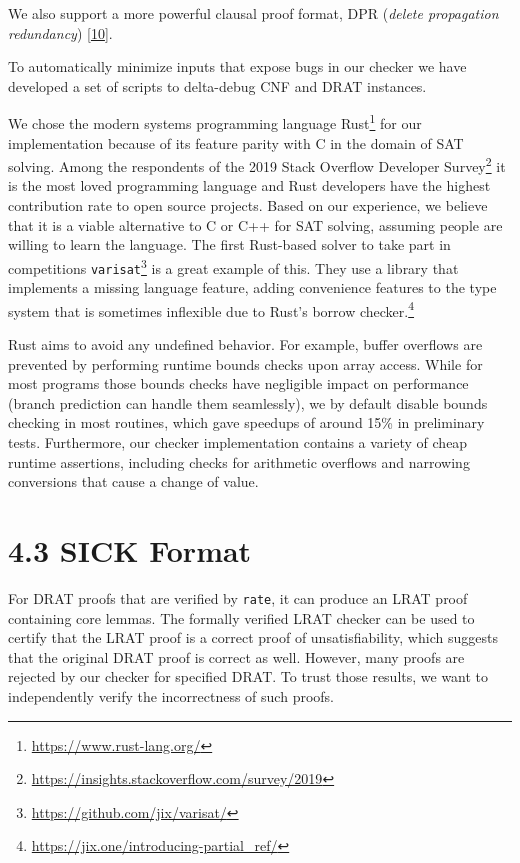 \documentclass[
]{report}
\begin{document}
We also support a more powerful clausal proof format, DPR (\emph{delete
propagation redundancy})
{[}\protect\hyperlink{ref-DBLP:confux2fcadeux2fHeuleKB17}{10}{]}.

To automatically minimize inputs that expose bugs in our checker we have
developed a set of scripts to delta-debug CNF and DRAT instances.

We chose the modern systems programming language Rust\footnote{\url{https://www.rust-lang.org/}}
for our implementation because of its feature parity with C in the
domain of SAT solving. Among the respondents of the 2019 Stack Overflow
Developer Survey\footnote{\url{https://insights.stackoverflow.com/survey/2019}}
it is the most loved programming language and Rust developers have the
highest contribution rate to open source projects. Based on our
experience, we believe that it is a viable alternative to C or C++ for
SAT solving, assuming people are willing to learn the language. The
first Rust-based solver to take part in competitions
\texttt{varisat}\footnote{\url{https://github.com/jix/varisat/}} is a
great example of this. They use a library that implements a missing
language feature, adding convenience features to the type system that is
sometimes inflexible due to Rust's borrow checker.\footnote{\url{https://jix.one/introducing-partial_ref/}}

Rust aims to avoid any undefined behavior. For example, buffer overflows
are prevented by performing runtime bounds checks upon array access.
While for most programs those bounds checks have negligible impact on
performance (branch prediction can handle them seamlessly), we by
default disable bounds checking in most routines, which gave speedups of
around 15\% in preliminary tests. Furthermore, our checker
implementation contains a variety of cheap runtime assertions, including
checks for arithmetic overflows and narrowing conversions that cause a
change of value.

\hypertarget{sick-format}{%
\section{4.3 SICK Format}\label{sick-format}}

For DRAT proofs that are verified by \texttt{rate}, it can produce an
LRAT proof containing core lemmas. The formally verified LRAT checker
can be used to certify that the LRAT proof is a correct proof of
unsatisfiability, which suggests that the original DRAT proof is correct
as well. However, many proofs are rejected by our checker for specified
DRAT. To trust those results, we want to independently verify the
incorrectness of such proofs.
\end{document}
